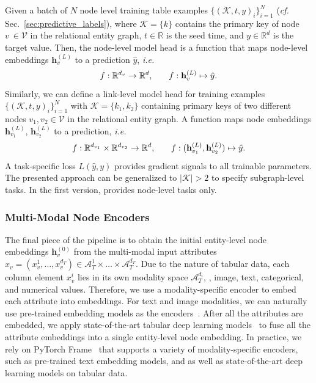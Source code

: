 Given a batch of $N$ node level training table examples $\{(\mathcal{K}, t, y)_i\}_{i=1}^N$ (\emph{cf.} Sec.~\ref{sec:predictive_labels}), where $\mathcal{K} = \{k\}$ contains the primary key of node $v~\in \mathcal V$ in the relational entity graph, $t\in \mathbb{R}$ is the seed time, and $y\in\mathbb{R}^d$ is the target value. Then, the node-level model head is a function that maps node-level embeddings $\mathbf{h}^{(L)}_{v}$ to a prediction $\hat{y}$, \emph{i.e.} 
\begin{equation}
    f: \mathbb{R}^{d_{v}} \rightarrow \mathbb{R}^d \textnormal{,} \quad \quad  f: \mathbf{h}^{(L)}_{v} \mapsto \hat{y} \textnormal{.}
\end{equation}
Similarly, we can define a link-level model head for training examples $\{(\mathcal K, t, y)_i\}_{i=1}^N$ with $\mathcal{K} = \{k_1, k_2\}$ containing primary keys of two different nodes $v_1, v_2 \in \mathcal{V}$ in the relational entity graph. A function maps node embeddings $\mathbf{h}^{(L)}_{v_1}$, $\mathbf{h}^{(L)}_{v_2}$ to a prediction, \emph{i.e.}
\begin{equation}
    f: \mathbb{R}^{d_{v_1}} \times \mathbb{R}^{d_{v_2}} \rightarrow \mathbb{R}^d \textnormal{,} \quad \quad f: (\mathbf{h}^{(L)}_{v_1}, \mathbf{h}^{(L)}_{v_2}) \mapsto \hat{y} \textnormal{.}
\end{equation}
A task-specific loss $L(\hat{y}, y)$ provides gradient signals to all trainable parameters. The presented approach can be generalized to $|\mathcal K|>2$ to specify subgraph-level tasks. In the first version, \BenchmarkName provides node-level tasks only.




\subsubsection{Multi-Modal Node Encoders}
\label{sec:encoders}
The final piece of the pipeline is to obtain the initial entity-level node embeddings $\mathbf{h}^{(0)}_v$ from the multi-modal input attributes $x_v= (x_v^1, \ldots , x_v^{d_T}) \in \mathcal{A}_T^1 \times \ldots \times \mathcal{A}_T^{d_T}$.
Due to the nature of tabular data, each column element $x_v^i$ lies in its own modality space $\mathcal{A}_T^{d_i}$, \eg, image, text, categorical, and numerical values.
Therefore, we use a modality-specific encoder to embed each attribute into embeddings.
For text and image modalities, we can naturally use pre-trained embedding models as the encoders~\citep{reimers2019sentence}.
After all the attributes are embedded, we apply state-of-the-art tabular deep learning models~\citep{huang2020tabtransformer,arik2021tabnet,gorishniy2021revisiting,gorishniy2022embeddings,chen2023trompt} to fuse all the attribute embeddings into a single entity-level node embedding.
In practice, we rely on PyTorch Frame~\citep{Hu_PyTorch_Frame_A_2023} that supports a variety of modality-specific encoders, such as pre-trained text embedding models, and as well as state-of-the-art deep learning models on tabular data.

